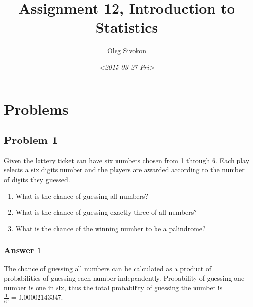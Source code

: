 \documentclass[11pt]{article}
\author{Oleg Sivokon}
\date{\textit{<2015-03-27 Fri>}}
\title{Assignment 12, Introduction to Statistics}
\begin{document}
\maketitle
\tableofcontents



\clearpage

\section{Problems}
\label{sec-1}

\subsection{Problem 1}
\label{sec-1-1}
Given the lottery ticket can have six numbers chosen from 1 through 6.
Each play selects a six digits number and the players are awarded according
to the number of digits they guessed.

\begin{enumerate}
\item What is the chance of guessing all numbers?
\item What is the chance of guessing exactly three of all numbers?
\item What is the chance of the winning number to be a palindrome?
\end{enumerate}

\subsubsection{Answer 1}
\label{sec-1-1-1}
The chance of guessing all numbers can be calculated as a product of
probabilities of guessing each number independently. Probability of
guessing one number is one in six, thus the total probability of
guessing the number is $\frac{1}{6^6} = \num{0.00002143347}$.
\end{document}
